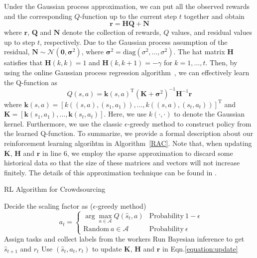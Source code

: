 Under the Gaussian process approximation, we can put all the observed rewards and the corresponding $Q$-function up to the current step $t$ together and obtain
\begin{equation}
\bm{r}=\bm{H}\bm{Q}+\bm{N}
\end{equation}
where $\bm{r}$, $\bm{Q}$ and $\bm{N}$ denote the collection of rewards, $Q$ values, and residual values up to step $t$, respectively.
Due to the Gaussian process assumption of the residual, $\bm{N}\sim \mathcal{N}(\bm{0},\bm{\sigma}^2)$, where $\bm{\sigma}^2=\textrm{diag}(\sigma^2,\ldots,\sigma^2)$.
The hat matrix $\bm{H}$ satisfies that $\bm{H}(k,k)=1$ and $\bm{H}(k,k+1)=-\gamma$ for $k=1,\ldots, t$.
Then, by using the online Gaussian process regression algorithm~\cite{engel2005reinforcement}, we can effectively learn the Q-function as
\begin{equation}
\label{equation:update}
Q(s,a) = \bm{k}(s,a) ^{\mathrm{T}}(\bm{K} +\bm{\sigma}^2)^{-1}\bm{H}^{-1}\bm{r}
\end{equation}
where $\bm{k}(s,a)=[k((s,a), (s_1,a_1)),\ldots, k((s,a), (s_t,a_t))]^{\mathrm{T}}$ and $\bm{K}=[\bm{k}(s_1,a_1),\ldots,\bm{k}(s_t,a_t)]$. Here, we use $k(\cdot, \cdot)$ to denote the Gaussian kernel.
Furthermore, we use the classic $\epsilon$-greedy method to construct policy from the learned Q-function.
To summarize, we provide a formal description about our reinforcement learning algorihtm in Algorithm~\ref{RAC}.
Note that, when updating $\bm{K}$, $\bm{H}$ and $\bm{r}$ in line 6, we employ the sparse approximation to discard some historical data so that the size of these matrices and vectors will not increase finitely. The details of this approximation technique can be found in \citet{gasic2014gaussian}.

\begin{algorithm}[tb]
   \caption{RL Algorithm for Crowdsourcing}
   \label{RAC}
   \small
\begin{algorithmic}[1]
   \STATE Decide the scaling factor as ($\epsilon$-greedy method)
			$$\ \ a_t=\left\{
			\begin{array}{ll}
				\arg\max_{a\in\mathcal{A}}Q(\hat{s}_t,a) & \mathrm{Probability\ } 1-\epsilon\\
				\mathrm{Random\ } a\in\mathcal{A} & \mathrm{Probability\ } \epsilon
			\end{array}						
			 \right.$$   
   \STATE Assign tasks and collect labels from the workers
   \STATE Run Bayesian inference to get $\hat{s}_{t+1}$ and $r_t$
   \STATE Use $(\hat{s}_t, a_t, r_t)$ to update $\bm{K}$, $\bm{H}$ and $\bm{r}$ in Eqn.\ref{equation:update}
   \ENDFOR
   \ENDFOR
\end{algorithmic}
\end{algorithm}
